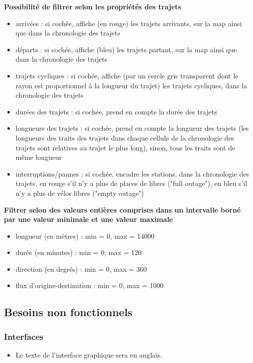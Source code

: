 \documentclass[12pt]{article}
\begin{document}
				\textbf{Possibilité de filtrer selon les propriétés des trajets}\par
					\begin{itemize}
						\item arrivées : si cochée, affiche (en rouge) les trajets arrivants, sur la map ainsi que dans la chronologie des trajets
						\item départs : si cochée, affiche (bleu) les trajets partant, sur la map ainsi que dans la chronologie des trajets
						\item trajets cycliques : si cochée, affiche (par un cercle gris transparent dont le rayon est proportionnel à la longueur du trajet) les trajets cycliques, dans la chronologie des trajets
						\item durées des trajets : si cochée, prend en compte la durée des trajets
						\item longueurs des trajets : si cochée, prend en compte la longueur des trajets (les longueurs des traits des trajets dans chaque cellule de la chronologie des trajets sont relatives au trajet le plus long), sinon, tous les  traits sont de même longueur
						\item interruptions/pannes : si cochée, encadre les stations, dans la chronologie des trajets, en rouge s'il n'y a plus de places de libres ("full outage"), en bleu s'il n'y a plus de vélos libres ("empty outage")\\
					\end{itemize}

				\textbf{Filtrer selon des valeurs entières comprises dans un intervalle borné par une valeur minimale et une valeur maximale}\par
					\begin{itemize}
						\item longueur (en mètres) : min = 0, max = 14000
						\item durée (en minutes) : min = 0; max = 120 
						\item direction (en degrés) : min = 0, max = 360
						\item flux d'origine-destination : min = 0, max = 1000
					\end{itemize}

		\subsection{Besoins non fonctionnels}
			\subsubsection{Interfaces}
				\begin{itemize}
					\item Le texte de l'interface graphique sera en anglais.
				\end{itemize}
\end{document}
